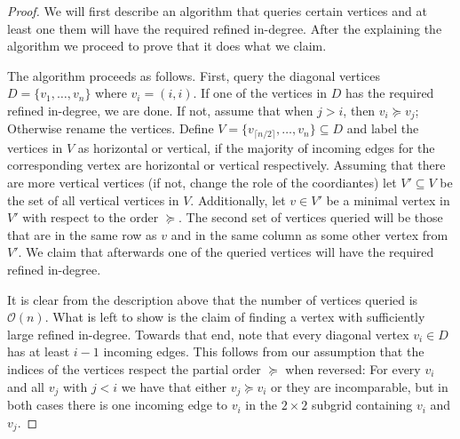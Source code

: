 \documentclass[a4paper,10pt]{article}
\newcommand{\indegree}{refined in-degree\xspace}
\begin{document}
\begin{proof}
  We will first describe an algorithm that queries certain vertices and at least one them will have the required \indegree. After the explaining the algorithm we proceed to prove that it does what we claim.
  
  The algorithm proceeds as follows. First, query the diagonal vertices $D = \{v_1,\ldots, v_n\}$ where $v_i = (i,i)$. If one of the vertices in $D$ has the required \indegree, we are done. If not, assume that when $j > i$, then $v_i \succeq v_j$; Otherwise rename the vertices. Define $V = \{v_{\lceil n/2 \rceil},\ldots,v_n\} \subseteq D$ and label the vertices in $V$ as horizontal or vertical, if the majority of incoming edges for the corresponding vertex are horizontal or vertical respectively. Assuming that there are more vertical vertices (if not, change the role of the coordiantes) let $V' \subseteq V$ be the set of all vertical vertices in $V$. Additionally, let $v \in V'$ be a minimal vertex in $V'$ with respect to the order $\succeq$. The second set of vertices queried will be those that are in the same row as $v$ and in the same column as some other vertex from $V'$. We claim that afterwards one of the queried vertices will have the required \indegree.
  
  It is clear from the description above that the number of vertices queried is $\mathcal{O}(n)$. What is left to show is the claim of finding a vertex with sufficiently large \indegree. Towards that end, note that every diagonal vertex $v_i \in D$ has at least $i - 1$ incoming edges. This follows from our assumption that the indices of the vertices respect the partial order $\succeq$ when reversed: For every $v_i$ and all $v_j$ with $j < i$ we have that either $v_j \succeq v_i$ or they are incomparable, but in both cases there is one incoming edge to $v_i$ in the $2\times 2$ subgrid containing $v_i$ and $v_j$. 
  

\end{proof}
\end{document}
